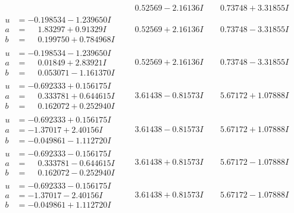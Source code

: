 \documentclass[1p]{elsarticle_modified}
\theoremstyle{definition}
\begin{document}
$$\begin{array}{c|c|c}
 & \phantom{-}0.52569 - 2.16136 I & \phantom{-}0.73748 + 3.31855 I \\ \hline\begin{aligned}
u &= -0.198534 - 1.239650 I \\
a &= \phantom{-}1.83297 + 0.91329 I \\
b &= \phantom{-}0.199750 + 0.784968 I\end{aligned}
 & \phantom{-}0.52569 + 2.16136 I & \phantom{-}0.73748 - 3.31855 I \\ \hline\begin{aligned}
u &= -0.198534 - 1.239650 I \\
a &= \phantom{-}0.01849 + 2.83921 I \\
b &= \phantom{-}0.053071 - 1.161370 I\end{aligned}
 & \phantom{-}0.52569 + 2.16136 I & \phantom{-}0.73748 - 3.31855 I \\ \hline\begin{aligned}
u &= -0.692333 + 0.156175 I \\
a &= \phantom{-}0.333781 + 0.644615 I \\
b &= \phantom{-}0.162072 + 0.252940 I\end{aligned}
 & \phantom{-}3.61438 - 0.81573 I & \phantom{-}5.67172 + 1.07888 I \\ \hline\begin{aligned}
u &= -0.692333 + 0.156175 I \\
a &= -1.37017 + 2.40156 I \\
b &= -0.049861 - 1.112720 I\end{aligned}
 & \phantom{-}3.61438 - 0.81573 I & \phantom{-}5.67172 + 1.07888 I \\ \hline\begin{aligned}
u &= -0.692333 - 0.156175 I \\
a &= \phantom{-}0.333781 - 0.644615 I \\
b &= \phantom{-}0.162072 - 0.252940 I\end{aligned}
 & \phantom{-}3.61438 + 0.81573 I & \phantom{-}5.67172 - 1.07888 I \\ \hline\begin{aligned}
u &= -0.692333 - 0.156175 I \\
a &= -1.37017 - 2.40156 I \\
b &= -0.049861 + 1.112720 I\end{aligned}
 & \phantom{-}3.61438 + 0.81573 I & \phantom{-}5.67172 - 1.07888 I \\ \hline\begin{aligned}

\end{aligned}
\end{array}$$
\end{document}
